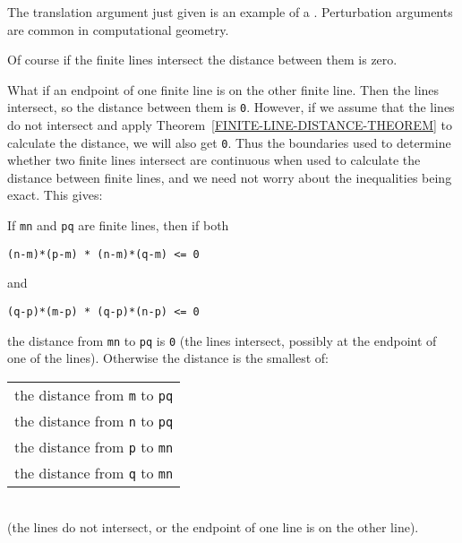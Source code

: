 \documentclass[12pt]{article}
\begin{document}
The translation argument just given is an example of a
.  Perturbation arguments are common
in computational geometry.

Of course if the finite lines intersect the distance between
them is zero.

What if an endpoint of one finite line is on the other finite
line.  Then the lines intersect, so the distance between them
is {\tt 0}.  However, if we assume that the lines do not
intersect and apply Theorem~\ref{FINITE-LINE-DISTANCE-THEOREM}
to calculate the distance, we will also get {\tt 0}.  Thus
the boundaries used to determine whether two finite lines
intersect are continuous when used to calculate the distance
between finite lines, and we need not worry about the inequalities
being exact.  This gives:

\begin{theorem}
If {\tt mn} and {\tt pq} are finite lines, then if
both \\
\centerline{\tt (n-m)*(p-m) * (n-m)*(q-m) <= 0}
and \\
\centerline{\tt (q-p)*(m-p) * (q-p)*(n-p) <= 0}
the distance from {\tt mn} to {\tt pq} is {\tt 0}
(the lines intersect, possibly at the endpoint of
one of the lines).
Otherwise the distance is the smallest of: \\
\hspace*{0.5in}\begin{tabular}{l}
the distance from {\tt m} to {\tt pq} \\
the distance from {\tt n} to {\tt pq} \\
the distance from {\tt p} to {\tt mn} \\
the distance from {\tt q} to {\tt mn} \\
\end{tabular} \\
(the lines do not intersect, or the endpoint of one line
is on the other line).
\end{theorem}


\newpage
\end{document}
